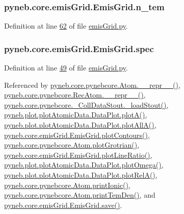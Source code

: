 \hypertarget{classpyneb_1_1core_1_1emis_grid_1_1_emis_grid_a7a86bfc0cd3ed0d14ccaf950fb183696}{
\subsubsection[{n\-\_\-tem}]{\setlength{\rightskip}{0pt plus 5cm}pyneb.\-core.\-emis\-Grid.\-Emis\-Grid.\-n\-\_\-tem}}\label{classpyneb_1_1core_1_1emis_grid_1_1_emis_grid_a7a86bfc0cd3ed0d14ccaf950fb183696}


Definition at line \hyperlink{emis_grid_8py_source_l00062}{62} of file \hyperlink{emis_grid_8py_source}{emis\-Grid.\-py}.

\hypertarget{classpyneb_1_1core_1_1emis_grid_1_1_emis_grid_a78618aff86ea296ecefddcc86d98b687}{
\subsubsection[{spec}]{\setlength{\rightskip}{0pt plus 5cm}pyneb.\-core.\-emis\-Grid.\-Emis\-Grid.\-spec}}\label{classpyneb_1_1core_1_1emis_grid_1_1_emis_grid_a78618aff86ea296ecefddcc86d98b687}


Definition at line \hyperlink{emis_grid_8py_source_l00049}{49} of file \hyperlink{emis_grid_8py_source}{emis\-Grid.\-py}.



Referenced by \hyperlink{pynebcore_8py_source_l02615}{pyneb.\-core.\-pynebcore.\-Atom.\-\_\-\-\_\-repr\-\_\-\-\_\-()}, \hyperlink{pynebcore_8py_source_l03154}{pyneb.\-core.\-pynebcore.\-Rec\-Atom.\-\_\-\-\_\-repr\-\_\-\-\_\-()}, \hyperlink{pynebcore_8py_source_l01178}{pyneb.\-core.\-pynebcore.\-\_\-\-Coll\-Data\-Stout.\-\_\-load\-Stout()}, \hyperlink{plot_atomic_data_8py_source_l00117}{pyneb.\-plot.\-plot\-Atomic\-Data.\-Data\-Plot.\-plot\-A()}, \hyperlink{plot_atomic_data_8py_source_l00189}{pyneb.\-plot.\-plot\-Atomic\-Data.\-Data\-Plot.\-plot\-All\-A()}, \hyperlink{emis_grid_8py_source_l00182}{pyneb.\-core.\-emis\-Grid.\-Emis\-Grid.\-plot\-Contours()}, \hyperlink{pynebcore_8py_source_l02443}{pyneb.\-core.\-pynebcore.\-Atom.\-plot\-Grotrian()}, \hyperlink{emis_grid_8py_source_l00241}{pyneb.\-core.\-emis\-Grid.\-Emis\-Grid.\-plot\-Line\-Ratio()}, \hyperlink{plot_atomic_data_8py_source_l00373}{pyneb.\-plot.\-plot\-Atomic\-Data.\-Data\-Plot.\-plot\-Omega()}, \hyperlink{plot_atomic_data_8py_source_l00262}{pyneb.\-plot.\-plot\-Atomic\-Data.\-Data\-Plot.\-plot\-Rel\-A()}, \hyperlink{pynebcore_8py_source_l02233}{pyneb.\-core.\-pynebcore.\-Atom.\-print\-Ionic()}, \hyperlink{pynebcore_8py_source_l02324}{pyneb.\-core.\-pynebcore.\-Atom.\-print\-Tem\-Den()}, and \hyperlink{emis_grid_8py_source_l00099}{pyneb.\-core.\-emis\-Grid.\-Emis\-Grid.\-save()}.

